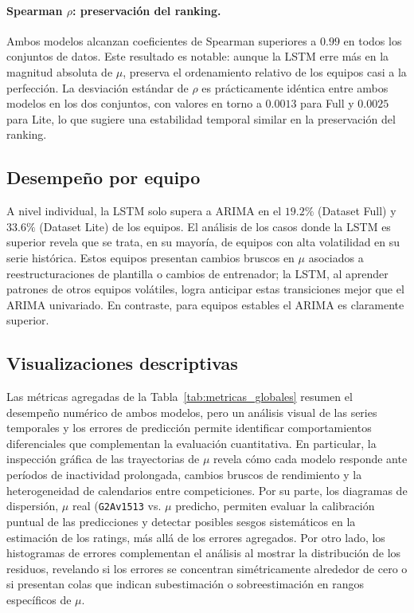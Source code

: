 \paragraph{Spearman \(\rho\): preservaci\'on del ranking.}
Ambos modelos alcanzan coeficientes de Spearman superiores a \(0.99\) en todos los conjuntos de datos. Este resultado es notable: aunque la LSTM erre m\'as en la magnitud absoluta de \(\mu\), preserva el ordenamiento relativo de los equipos casi a la perfecci\'on. La desviaci\'on est\'andar de \(\rho\) es pr\'acticamente id\'entica entre ambos modelos en los dos conjuntos, con valores en torno a $0{.}0013$ para Full y $0{.}0025$ para Lite, lo que sugiere una estabilidad temporal similar en la preservaci\'on del ranking.

\subsection{Desempe\~no por equipo}

A nivel individual, la LSTM solo supera a ARIMA en el $19{.}2\%$ (Dataset Full) y $33{.}6\%$ (Dataset Lite) de los equipos. El an\'alisis de los casos donde la LSTM es superior revela que se trata, en su mayor\'ia, de equipos con alta volatilidad en su serie hist\'orica. Estos equipos presentan cambios bruscos en \(\mu\) asociados a reestructuraciones de plantilla o cambios de entrenador; la LSTM, al aprender patrones de otros equipos vol\'atiles, logra anticipar estas transiciones mejor que el ARIMA univariado. En contraste, para equipos estables el ARIMA es claramente superior.

\subsection{Visualizaciones descriptivas}

Las m\'etricas agregadas de la Tabla~\ref{tab:metricas_globales} resumen el desempe\~no num\'erico de ambos modelos, pero un an\'alisis visual de las series temporales y los errores de predicci\'on permite identificar comportamientos diferenciales que complementan la evaluaci\'on cuantitativa. En particular, la inspecci\'on gr\'afica de las trayectorias de \(\mu\) revela c\'omo cada modelo responde ante per\'iodos de inactividad prolongada, cambios bruscos de rendimiento y la heterogeneidad de calendarios entre competiciones. Por su parte, los diagramas de dispersi\'on, \(\mu\) real (\texttt{G2Av1513}  vs. \(\mu\) predicho, permiten evaluar la calibraci\'on puntual de las predicciones y detectar posibles sesgos sistem\'aticos en la estimaci\'on de los ratings, m\'as all\'a de los errores agregados. Por otro lado, los histogramas de errores complementan el an\'alisis al mostrar la distribuci\'on de los residuos, revelando si los errores se concentran sim\'etricamente alrededor de cero o si presentan colas que indican subestimaci\'on o sobreestimaci\'on en rangos espec\'ificos de \(\mu\).

